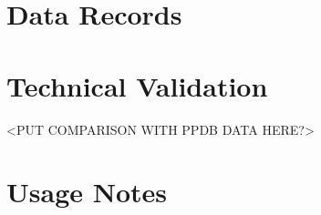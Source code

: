 \documentclass[english]{article}
\begin{document}
\section*{Data Records}





\section*{Technical Validation}

<PUT COMPARISON WITH PPDB DATA HERE?>

\section*{Usage Notes}
\end{document}

